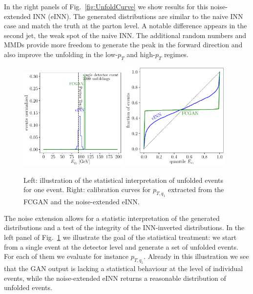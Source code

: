 In the right panels of Fig.~\ref{fig:UnfoldCurve} we show results for
this noise-extended INN (eINN). The generated distributions are similar to
the naive INN case and match the truth at the parton level. A notable
difference appears in the second jet, the weak spot of the naive
INN. The additional random numbers and MMDs provide more freedom to
generate the peak in the forward direction and also improve the
unfolding in the low-$p_T$ and high-$p_T$ regimes.\bigskip

\begin{figure}[t]
\includegraphics[page=9, width=0.48\textwidth]{figures/cINN/point1_inn_fcgan}
\includegraphics[page=20, width=0.48\textwidth]{figures/cINN/CalibrationCurveINNFCGAN}
\caption{Left: illustration of the statistical interpretation of
  unfolded events for one event. Right: calibration curves for
  $p_{T,q_1}$ extracted from the FCGAN and the noise-extended eINN.}
\label{fig:quantile1}
\end{figure}

The noise extension allows for a
statistic interpretation of the generated distributions and a test of
the integrity of the INN-inverted distributions. In the left panel of
Fig.~\ref{fig:quantile1} we illustrate the goal of the statistical
treatment: we start from a single event at the detector level and
generate a set of unfolded events. For each of them we evaluate for
instance $p_{T,q_1}$. Already in this illustration we see that the GAN
output is lacking a statistical behaviour at the level of individual
events, while the noise-extended eINN returns a reasonable
distribution of unfolded events.

